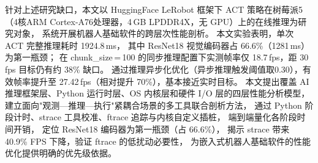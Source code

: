 针对上述研究缺口，本文以 HuggingFace LeRobot 框架\cite{lerobot}下
ACT 策略在树莓派5（4核ARM Cortex-A76处理器，4\,GB LPDDR4X，无 GPU）上的在线推理为研究对象，
系统开展机器人基础软件的跨层次性能剖析。
本文实验表明，单次 ACT 完整推理耗时 1924.8\,ms，
其中 ResNet18 视觉编码器占 66.6\%（1281\,ms）为第一瓶颈；
在 chunk\_size\,=\,100 的同步推理配置下实测帧率仅 18.7\,fps，距 30\,fps 目标仍有约 38\% 缺口。
通过推理异步化优化（异步推理触发阈值取0.30），有效帧率提升至 27.42\,fps（相对提升 70\%），基本接近实时目标。
本文提出覆盖 AI 推理框架层、Python 运行时层、OS 内核层和硬件 I/O 层的四层性能分析模型，
建立面向"观测—推理—执行"紧耦合场景的多工具联合剖析方法，
通过 Python 阶段计时、strace 工具校准、ftrace 追踪与内核自定义插桩，
端到端量化各阶段时间开销，
定位 ResNet18 编码器为第一瓶颈（占 66.6\%），
揭示 strace 带来 40.9\% FPS 下降，验证 ftrace 的低扰动必要性，
为嵌入式机器人基础软件的性能优化提供明确的优先级依据。
